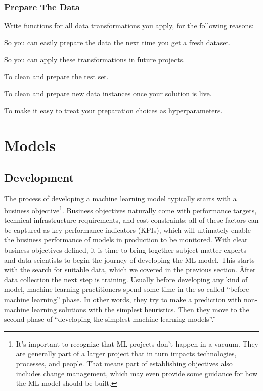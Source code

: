 \subsubsection*{Prepare The Data}
Write functions for all data transformations you apply, for the following reasons:
\bit
\item So you can easily prepare the data the next time you get a fresh dataset.
\item So you can apply these transformations in future projects.
\item To clean and prepare the test set.
\item To clean and prepare new data instances once your solution is live.
\item To make it easy to treat your preparation choices as hyperparameters.
\eit

\section{Models}

\subsection{Development}

The process of developing a machine learning model typically starts with a business objective\footnote{It's important
to recognize that ML projects don't happen in a vacuum. They are generally part of a larger project that in turn
impacts technologies, processes, and people. That means part of establishing objectives also includes change
management, which may even provide some guidance for how the ML model should be built.}. Business objectives
naturally come with performance targets, technical infrastructure requirements, and cost constraints; all of these
factors can be captured as key performance indicators (KPIs), which will ultimately enable the business performance
of models in production to be monitored. \v

With clear business objectives defined, it is time to bring together subject matter experts and data scientists to
begin the journey of developing the ML model. This starts with the search for suitable  data, which we covered in the
previous section. \v

After data collection the next step is training. Usually before developing any kind of model, machine learning
practitioners spend some time in the so called ``before machine learning'' phase. In other words, they try to make a
prediction with non-machine learning solutions with the simplest heuristics. Then they move to the second phase of
``developing the simplest machine learning models''. \v

